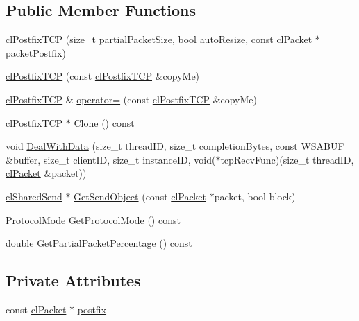 \subsection*{Public Member Functions}
\begin{DoxyCompactItemize}
\item 
\hyperlink{classcl_postfix_t_c_p_ae72bc321b2048b0744463f04a10bbcbd}{clPostfixTCP} (size\_\-t partialPacketSize, bool \hyperlink{classcl_shared_t_c_p_aadfbe0c28871af737963ac9205a71a6c}{autoResize}, const \hyperlink{classcl_packet}{clPacket} $\ast$packetPostfix)
\item 
\hyperlink{classcl_postfix_t_c_p_aab07be864d63cdfcb354cf0f576d54b7}{clPostfixTCP} (const \hyperlink{classcl_postfix_t_c_p}{clPostfixTCP} \&copyMe)
\item 
\hyperlink{classcl_postfix_t_c_p}{clPostfixTCP} \& \hyperlink{classcl_postfix_t_c_p_abe75cd206cd55b4a1749c8331c9c823e}{operator=} (const \hyperlink{classcl_postfix_t_c_p}{clPostfixTCP} \&copyMe)
\item 
\hyperlink{classcl_postfix_t_c_p}{clPostfixTCP} $\ast$ \hyperlink{classcl_postfix_t_c_p_ac4d43cd023dd185e2bd3be28b50a6d79}{Clone} () const 
\item 
void \hyperlink{classcl_postfix_t_c_p_a05fecc4be9f61c1bd19ae6afeef05c79}{DealWithData} (size\_\-t threadID, size\_\-t completionBytes, const WSABUF \&buffer, size\_\-t clientID, size\_\-t instanceID, void($\ast$tcpRecvFunc)(size\_\-t threadID, \hyperlink{classcl_packet}{clPacket} \&packet))
\item 
\hyperlink{classcl_shared_send}{clSharedSend} $\ast$ \hyperlink{classcl_postfix_t_c_p_a58ffdd4db7b50d29247969df69d93679}{GetSendObject} (const \hyperlink{classcl_packet}{clPacket} $\ast$packet, bool block)
\item 
\hyperlink{classcl_shared_protocol_a4b0b9c82b8ae4eee78c6308c35afd47b}{ProtocolMode} \hyperlink{classcl_postfix_t_c_p_a109cb621bfff71084c7e07ae580c4c5c}{GetProtocolMode} () const 
\item 
double \hyperlink{classcl_postfix_t_c_p_a98bc079655197fb16bd0babd6c077cb3}{GetPartialPacketPercentage} () const 
\end{DoxyCompactItemize}
\subsection*{Private Attributes}
\begin{DoxyCompactItemize}
\item 
const \hyperlink{classcl_packet}{clPacket} $\ast$ \hyperlink{classcl_postfix_t_c_p_a505a8a31942635616ccca3922e06454b}{postfix}
\end{DoxyCompactItemize}



